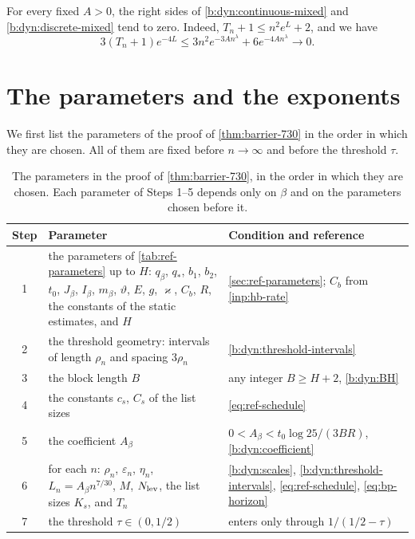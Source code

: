 For every fixed $A>0$, the right sides of \eqref{b:dyn:continuous-mixed} and \eqref{b:dyn:discrete-mixed} tend to zero. Indeed, $T_n+1\le n^2e^L+2$, and we have
\begin{equation}\label{eq:bp-mixed-limit}
 3(T_n+1)e^{-4L}\le3n^2e^{-3An^\lambda}+6e^{-4An^\lambda}\longrightarrow0.
\end{equation}

\section{The parameters and the exponents}\label{b:sec:completion}

We first list the parameters of the proof of \cref{thm:barrier-730} in the order in which they are chosen. All of them are fixed before $n\to\infty$ and before the threshold $\tau$.

\begin{table}[ht]
\centering
\small
\begin{tabular}{@{}c>{\raggedright\arraybackslash}p{}>{\raggedright\arraybackslash}p{}@{}}
\toprule
Step & Parameter & Condition and reference \\
\midrule
1 & the parameters of \cref{tab:ref-parameters} up to $H$: $q_\beta$, $q_*$, $b_1$, $b_2$, $t_0$, $J_\beta$, $I_\beta$, $m_\beta$, $\vartheta$, $E$, $g$, $\varkappa$, $C_b$, $R$, the constants of the static estimates, and $H$ & \cref{sec:ref-parameters}; $C_b$ from \cref{inp:hb-rate} \\
2 & the threshold geometry: intervals of length $\rho_n$ and spacing $3\rho_n$ & \eqref{b:dyn:threshold-intervals} \\
3 & the block length $B$ & any integer $B\ge H+2$, \eqref{b:dyn:BH} \\
4 & the constants $c_s$, $C_s$ of the list sizes & \eqref{eq:ref-schedule} \\
5 & the coefficient $A_\beta$ & $0<A_\beta<t_0\log25/(3BR)$, \eqref{b:dyn:coefficient} \\
6 & for each $n$: $\rho_n$, $\varepsilon_n$, $\eta_n$, $L_n=A_\beta n^{7/30}$, $M$, $N_{\rm lev}$, the list sizes $K_s$, and $T_n$ & \eqref{b:dyn:scales}, \eqref{b:dyn:threshold-intervals}, \eqref{eq:ref-schedule}, \eqref{eq:bp-horizon} \\
7 & the threshold $\tau\in(0,1/2)$ & enters only through $1/(1/2-\tau)$ \\
\bottomrule
\end{tabular}
\caption{The parameters in the proof of \cref{thm:barrier-730}, in the order in which they are chosen. Each parameter of Steps 1--5 depends only on $\beta$ and on the parameters chosen before it.}
\label{tab:bp-order}
\end{table}

